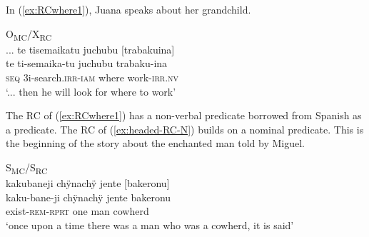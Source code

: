 In (\ref{ex:RCwhere1}), Juana speaks about her grandchild.

\ea\label{ex:RCwhere1}
\begingl
\glpreamble \textup{O\textsubscript{MC}/X\textsubscript{RC}}\\... te tisemaikatu juchubu \textup{[}trabakuina\textup{]}\\
\gla te ti-semaika-tu juchubu trabaku-ina\\
\glb \textsc{seq} 3i-search.\textsc{irr}-\textsc{iam} where work-\textsc{irr.nv}\\
\glft ‘... then he will look for where to work’
\endgl
\trailingcitation{[jxx-p110923l-1.193]}
\xe

The RC of (\ref{ex:RCwhere1}) has a non-verbal predicate borrowed from Spanish as a predicate. The RC of (\ref{ex:headed-RC-N}) builds on a nominal predicate. This is the beginning of the story about the enchanted man told by Miguel.

\newpage
\ea\label{ex:headed-RC-N}
\begingl
\glpreamble \textup{S\textsubscript{MC}/S\textsubscript{RC}}\\kakubaneji chÿnachÿ jente \textup{[}bakeronu\textup{]}\\
\gla kaku-bane-ji chÿnachÿ jente bakeronu\\
\glb exist-\textsc{rem}-\textsc{rprt} one man cowherd\\
\glft ‘once upon a time there was a man who was a cowherd, it is said’
\endgl
\trailingcitation{[mxx-n151017l-1.01]}
\xe

%

